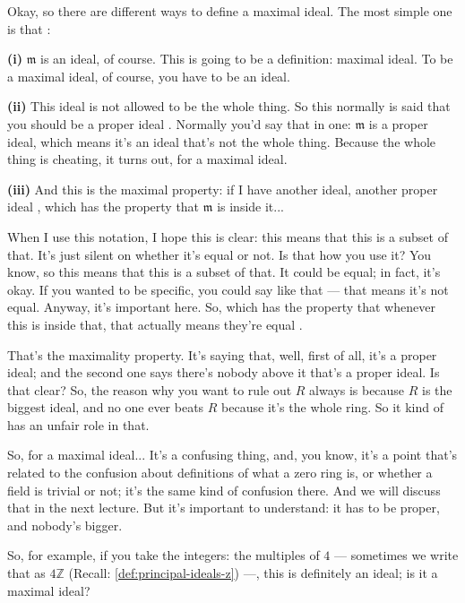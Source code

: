 \begin{speech}[00:37:56 - 00:40:01]
Okay, so there are different ways to define a maximal ideal. The most simple one is that :

\textbf{(i)} $\mathfrak{m}$ is an ideal, of course.  This is going to be a definition: maximal ideal. To be a maximal ideal, of course, you have to be an ideal.

\textbf{(ii)} This ideal is not allowed to be the whole thing. So this normally is said that you should be a proper ideal . Normally you'd say that in one: $\mathfrak{m}$ is a proper ideal, which means it's an ideal that's not the whole thing. Because the whole thing is cheating, it turns out, for a maximal ideal.

\textbf{(iii)} And this is the maximal property: if I have another ideal, another proper ideal , which has the property that $\mathfrak{m}$ is inside it... 

When I use this notation, I hope this is clear: this means that this is a subset of that. It's just silent on whether it's equal or not. Is that how you use it? You know, so this means that this is a subset of that. It could be equal; in fact, it's okay. If you wanted to be specific, you could say like that --- that means it's not equal. Anyway, it's important here. So, which has the property that whenever this is inside that, that actually means they're equal .

That's the maximality property. It's saying that, well, first of all, it's a proper ideal; and the second one says there's nobody above it that's a proper ideal. Is that clear? So, the reason why you want to rule out $R$ always is because $R$ is the biggest ideal, and no one ever beats $R$ because it's the whole ring. So it kind of has an unfair role in that.
\end{speech}

\begin{speech}[00:40:01 - 00:40:55]
So, for a maximal ideal... It's a confusing thing, and, you know, it's a point that's related to the confusion about definitions of what a zero ring is, or whether a field is trivial or not; it's the same kind of confusion there. And we will discuss that in the next lecture. But it's important to understand: it has to be proper, and nobody's bigger.

So, for example, if you take the integers: the multiples of $4$ --- sometimes we write that as $4\mathbb{Z}$ (Recall: \cref{def:principal-ideals-z}) ---, this is definitely an ideal; is it a maximal ideal? 
\end{speech}

